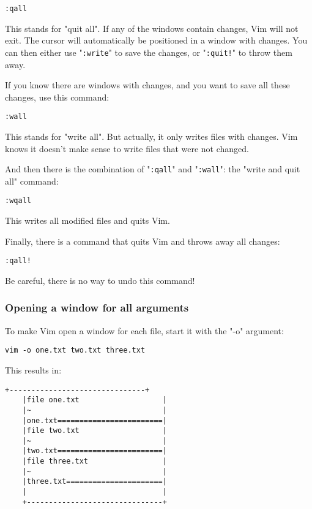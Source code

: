  \begin{Verbatim}[samepage=true]
 :qall
 \end{Verbatim}

This stands for "quit all".
If any of the windows contain changes, Vim will not exit.
The cursor will automatically be positioned in a window with changes.
You can then either use "\texttt{:write}" to save the changes, or "\texttt{:quit!}" to throw them away.

If you know there are windows with changes, and you want to save all these changes, use this command:

 \begin{Verbatim}[samepage=true]
 :wall
 \end{Verbatim}

This stands for "write all".
But actually, it only writes files with changes.
Vim knows it doesn't make sense to write files that were not changed.

And then there is the combination of "\texttt{:qall}" and "\texttt{:wall}": the "write and quit all" command:

 \begin{Verbatim}[samepage=true]
 :wqall
 \end{Verbatim}

This writes all modified files and quits Vim.

Finally, there is a command that quits Vim and throws away all changes:

 \begin{Verbatim}[samepage=true]
 :qall!
 \end{Verbatim}

Be careful, there is no way to undo this command!
\subsubsection{Opening a window for all arguments}
To make Vim open a window for each file, start it with the "-o" argument:

 \begin{Verbatim}[samepage=true]
 vim -o one.txt two.txt three.txt
 \end{Verbatim}

This results in:

\begin{Verbatim}[samepage=true]
    +-------------------------------+
    |file one.txt                   |
    |~                              |
    |one.txt========================|
    |file two.txt                   |
    |~                              |
    |two.txt========================|
    |file three.txt                 |
    |~                              |
    |three.txt======================|
    |                               |
    +-------------------------------+
\end{Verbatim}

